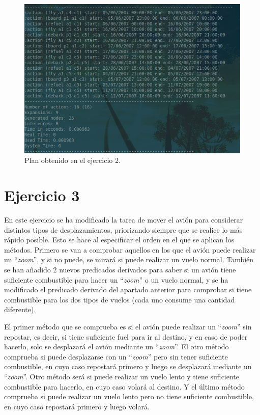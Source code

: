 \documentclass[11pt,a4paper]{article}
\begin{document}
\begin{figure}[H]
\centering
\includegraphics[scale=0.4]{img/e2.png}
\caption{Plan obtenido en el ejercicio 2.}
\end{figure}

\section{Ejercicio 3}

En este ejercicio se ha modificado la tarea de mover el avión para considerar distintos tipos de desplazamientos, priorizando siempre
que se realice lo más rápido posible. Esto se hace al especificar el orden en el que se aplican los métodos. Primero se van a
comprobar aquellos en los que el avión puede realizar un ``\textit{zoom}'', y si no puede, se mirará si puede realizar un vuelo
normal. También se han añadido 2 nuevos predicados derivados para saber si un avión tiene suficiente combustible para hacer un
``\textit{zoom}'' o un vuelo normal, y se ha modificado el predicado derivado del apartado anterior para comprobar si tiene
combustible para los dos tipos de vuelos (cada uno consume una cantidad diferente).

El primer método que se comprueba es si el avión puede realizar un ``\textit{zoom}'' sin repostar, es decir,
si tiene suficiente fuel para ir al destino, y en caso de poder hacerlo, solo se desplazará el avión mediante un ``\textit{zoom}''.
El otro método comprueba si puede desplazarse con un ``\textit{zoom}'' pero sin tener suficiente combustible, en cuyo caso repostará
primero y luego se desplazará mediante un ``\textit{zoom}''. Otro método será si puede realizar un vuelo lento y tiene suficiente
combustible para hacerlo, en cuyo caso volará al destino. Y el último método comprueba si puede realizar un vuelo lento pero no tiene
suficiente combustible, en cuyo caso repostará primero y luego volará.
\end{document}
